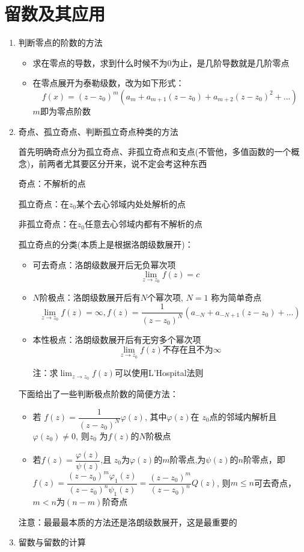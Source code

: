 \documentclass[a4paper,11pt,UTF8]{article}
\begin{document}
\section{留数及其应用}
\begin{enumerate}
	\item 判断零点的阶数的方法
	\begin{itemize}
		\item 求在零点的导数，求到什么时候不为0为止，是几阶导数就是几阶零点
		\item 在零点展开为泰勒级数，改为如下形式：
		$$f(x)=(z-z_0)^m(a_m+a_{m+1}(z-z_0)+a_{m+2}(z-z_0)^2+...)$$
		$m$即为零点阶数
	\end{itemize}
	\item  奇点、孤立奇点、判断孤立奇点种类的方法
	
	首先明确奇点分为孤立奇点、非孤立奇点和支点(不管他，多值函数的一个概念)，前两者尤其要区分开来，说不定会考这种东西
	
	奇点：不解析的点
	
	孤立奇点：在$z_0$某个去心邻域内处处解析的点
	
	非孤立奇点：在$z_0$任意去心邻域内都有不解析的点
	
	孤立奇点的分类(本质上是根据洛朗级数展开)：
	\begin{itemize}
		\item 可去奇点：洛朗级数展开后无负幂次项
		$$\lim_{z\to z_0}f(z)=c$$
		\item $N$阶极点：洛朗级数展开后有$N$个幂次项, $N=1$ 称为简单奇点
		$$\lim_{z\to z_0}f(z)=\infty,f(z)=\frac{1}{(z-z_0)^N}(a_{-N}+a_{-N+1}(z-z_0)+...)$$
		\item 本性极点：洛朗级数展开后有无穷多个幂次项
		$$\lim_{z\to z_0}f(z)\text{不存在且不为}\infty$$
		
		注：求$\lim_{z\to z_0}f(z)$可以使用L'Hospital法则
	\end{itemize}
	下面给出了一些判断极点阶数的简便方法：
	\begin{itemize}
		\item 若 $f(z)=\dfrac{1}{(z-z_0)^N}\varphi(z)$, 其中$\varphi(z)$在 $z_{0}$点的邻域内解析且 $\varphi(z_0)\neq0$, 则$z_0$ 为$f(z)$的$N$阶极点
		\item 若$f(z){=}\dfrac{\varphi(z)}{\psi(z)}$,且 $z_0$为$\varphi(z)$的$m$阶零点,为$\psi(z)$的$n$阶零点，即 $f(z)=\dfrac{(z-z_0)^m\varphi_1(z)}{(z-z_0)^n\psi_1(z)}=\dfrac{(z-z_0)^m}{(z-z_0)^n}Q(z)$, 则$m\leq n$可去奇点，$m<n$为$(n-m)$阶奇点
	\end{itemize}
	注意：最最最本质的方法还是洛朗级数展开，这是最重要的
	\item 留数与留数的计算
	

\end{enumerate}
\end{document}
